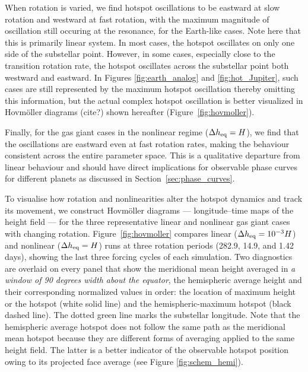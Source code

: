 \documentclass[trackchanges,twocolumn]{aastex7}
\begin{document}
When rotation is varied, we find hotspot oscillations to be eastward at slow rotation and westward at fast rotation, with the maximum magnitude of oscillation still occuring at the resonance, for the Earth-like cases. Note here that this is primarily linear system. In most cases, the hotspot oscillates on only one side of the substellar point. However, in some cases, especially close to the transition rotation rate, the hotspot oscillates across the substellar point both westward and eastward. In Figures \ref{fig:earth_analog} and \ref{fig:hot_Jupiter}, such cases are still represented by the maximum hotspot oscillation thereby omitting this information, but the actual complex hotspot oscillation is better visualized in Hovmöller diagrams {\color{red} (cite?)} shown hereafter (Figure~\ref{fig:hovmoller}).  

Finally, for the gas giant cases in the nonlinear regime ($\Delta h_{\rm eq} = H$), we find that the oscillations are eastward even at fast rotation rates, making the behaviour consistent across the entire parameter space. This is a qualitative departure from linear behaviour and should have direct implications for observable phase curves for different planets as discussed in Section~\ref{sec:phase_curves}.

To visualise how rotation and nonlinearities alter the hotspot dynamics and track its movement, we construct Hovmöller diagrams — longitude--time maps of the height field — for the three representative linear and nonlinear gas giant cases with changing rotation. Figure~\ref{fig:hovmoller} compares linear ($\Delta h_{\rm eq} = 10^{-3}H$) and nonlinear ($\Delta h_{\rm eq} = H$) runs at three rotation periods (282.9, 14.9, and 1.42 days), showing the last three forcing cycles of each simulation. Two diagnostics are overlaid on every panel that show the meridional mean height averaged in \textit{a window of 90 degrees width about the equator}, the hemispheric average height and their corresponding normalized values in order: the location of maximum height or the hotspot (white solid line) and the hemispheric-maximum hotspot (black dashed line). The dotted green line marks the substellar longitude. Note that the hemispheric average hotspot does not follow the same path as the meridional mean hotspot because they are different forms of averaging applied to the same height field. The latter is a better indicator of the observable hotspot position owing to its projected face average (see Figure \ref{fig:schem_hemi}). 
\end{document}
